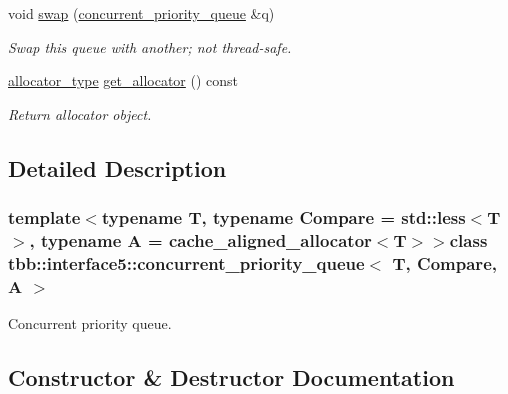 \begin{DoxyCompactItemize}
void \hyperlink{classtbb_1_1interface5_1_1concurrent__priority__queue_aa6ee6d356e538b67a7cb4e242e6e36c9}{swap} (\hyperlink{classtbb_1_1interface5_1_1concurrent__priority__queue}{concurrent\+\_\+priority\+\_\+queue} \&q)
\begin{DoxyCompactList}\small\item\em Swap this queue with another; not thread-\/safe. \end{DoxyCompactList}\item 
\hypertarget{classtbb_1_1interface5_1_1concurrent__priority__queue_a312e88e51246da4c516d35abbb30721a}{}\hyperlink{classtbb_1_1interface5_1_1concurrent__priority__queue_a1d2cebf242fa83d88eebdc3ad6891fb1}{allocator\+\_\+type} \hyperlink{classtbb_1_1interface5_1_1concurrent__priority__queue_a312e88e51246da4c516d35abbb30721a}{get\+\_\+allocator} () const \label{classtbb_1_1interface5_1_1concurrent__priority__queue_a312e88e51246da4c516d35abbb30721a}

\begin{DoxyCompactList}\small\item\em Return allocator object. \end{DoxyCompactList}\end{DoxyCompactItemize}


\subsection{Detailed Description}
\subsubsection*{template$<$typename T, typename Compare = std\+::less$<$\+T$>$, typename A = cache\+\_\+aligned\+\_\+allocator$<$\+T$>$$>$class tbb\+::interface5\+::concurrent\+\_\+priority\+\_\+queue$<$ T, Compare, A $>$}

Concurrent priority queue. 

\subsection{Constructor \& Destructor Documentation}
\hypertarget{classtbb_1_1interface5_1_1concurrent__priority__queue_a332d26234f9c37a6b7ba269c648815d0}{}
